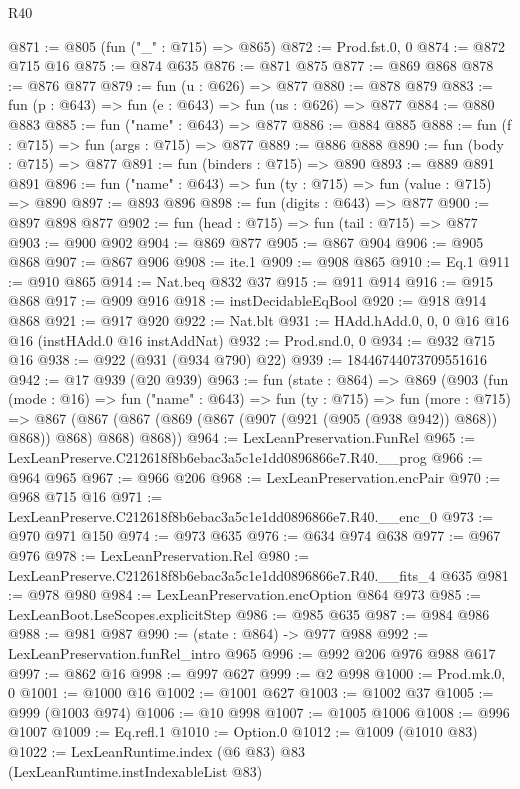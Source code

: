 \begin{lexlean}{R40}
\begin{coremodule}
@871 := @805 (fun ("_" : @715) => @865)
@872 := Prod.fst.{0, 0}
@874 := @872 @715 @16
@875 := @874 @635
@876 := @871 @875
@877 := @869 @868
@878 := @876 @877
@879 := fun (u : @626) => @877
@880 := @878 @879
@883 := fun (p : @643) => fun (e : @643) => fun (us : @626) => @877
@884 := @880 @883
@885 := fun ("name" : @643) => @877
@886 := @884 @885
@888 := fun (f : @715) => fun (args : @715) => @877
@889 := @886 @888
@890 := fun (body : @715) => @877
@891 := fun (binders : @715) => @890
@893 := @889 @891 @891
@896 := fun ("name" : @643) => fun (ty : @715) => fun (value : @715) => @890
@897 := @893 @896
@898 := fun (digits : @643) => @877
@900 := @897 @898 @877
@902 := fun (head : @715) => fun (tail : @715) => @877
@903 := @900 @902
@904 := @869 @877
@905 := @867 @904
@906 := @905 @868
@907 := @867 @906
@908 := ite.{1}
@909 := @908 @865
@910 := Eq.{1}
@911 := @910 @865
@914 := Nat.beq @832 @37
@915 := @911 @914
@916 := @915 @868
@917 := @909 @916
@918 := instDecidableEqBool
@920 := @918 @914 @868
@921 := @917 @920
@922 := Nat.blt
@931 := HAdd.hAdd.{0, 0, 0} @16 @16 @16 (instHAdd.{0} @16 instAddNat)
@932 := Prod.snd.{0, 0}
@934 := @932 @715 @16
@938 := @922 (@931 (@934 @790) @22)
@939 := 18446744073709551616
@942 := @17 @939 (@20 @939)
@963 := fun (state : @864) =>
  @869
    (@903
      (fun (mode : @16) =>
      fun ("name" : @643) =>
      fun (ty : @715) =>
      fun (more : @715) =>
      @867 (@867 (@867 (@869 (@867 (@907 (@921 (@905 (@938 @942)) @868)) @868)) @868) @868) @868))
@964 := LexLeanPreservation.FunRel
@965 := LexLeanPreserve.C212618f8b6ebac3a5c1e1dd0896866e7.R40.__prog
@966 := @964 @965
@967 := @966 @206
@968 := LexLeanPreservation.encPair
@970 := @968 @715 @16
@971 := LexLeanPreserve.C212618f8b6ebac3a5c1e1dd0896866e7.R40.__enc_0
@973 := @970 @971 @150
@974 := @973 @635
@976 := @634 @974 @638
@977 := @967 @976
@978 := LexLeanPreservation.Rel
@980 := LexLeanPreserve.C212618f8b6ebac3a5c1e1dd0896866e7.R40.__fits_4 @635
@981 := @978 @980
@984 := LexLeanPreservation.encOption @864 @973
@985 := LexLeanBoot.LseScopes.explicitStep
@986 := @985 @635
@987 := @984 @986
@988 := @981 @987
@990 := (state : @864) -> @977 @988
@992 := LexLeanPreservation.funRel_intro @965
@996 := @992 @206 @976 @988 @617
@997 := @862 @16
@998 := @997 @627
@999 := @2 @998
@1000 := Prod.mk.{0, 0}
@1001 := @1000 @16
@1002 := @1001 @627
@1003 := @1002 @37
@1005 := @999 (@1003 @974)
@1006 := @10 @998
@1007 := @1005 @1006
@1008 := @996 @1007
@1009 := Eq.refl.{1}
@1010 := Option.{0}
@1012 := @1009 (@1010 @83)
@1022 := LexLeanRuntime.index
    (@6 @83)
    @83
    (LexLeanRuntime.instIndexableList @83)

\end{coremodule}
\end{lexlean}
